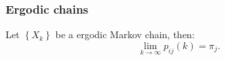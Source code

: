\begin{frame}
	\frametitle{Ergodic chains}
	\begin{theorem}
		Let $\left\{X_k\right\}$ be a ergodic Markov chain, then:
		\begin{equation*}
		\lim_{k \rightarrow \infty} p_{ij}(k) = \pi_j.
		\end{equation*}
	\end{theorem}
\end{frame}